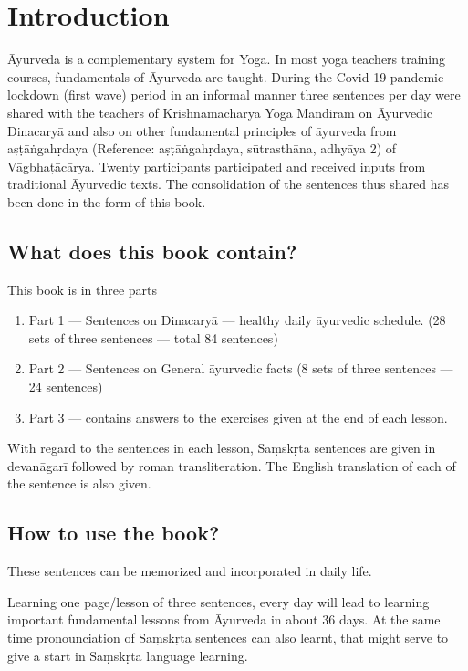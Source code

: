 \chapter*{Introduction}

Āyurveda is a complementary system for Yoga. In most yoga teachers training courses, fundamentals of Āyurveda are taught. During the Covid 19 pandemic lockdown (first wave) period in an informal manner three sentences per day were shared with the teachers of Krishnamacharya Yoga Mandiram on Āyurvedic Dinacaryā and also on other fundamental principles of āyurveda from aṣṭāṅgahṛdaya (Reference: aṣṭāṅgahṛdaya,  sūtrasthāna, adhyāya 2) of Vāgbhaṭācārya. Twenty participants participated and received inputs from traditional Āyurvedic texts. The consolidation of the sentences thus shared has been done in the form of this book.

\section*{What does this book contain?}
\vspace{-5pt}

This book is in three parts 
\vspace{-5pt}
\begin{enumerate}
\itemsep=0pt
\renewcommand{\theenumi}{\alph{enumi}}
\renewcommand{\labelenumi}{\theenumi.}
\item Part 1 --- Sentences on Dinacaryā --- healthy daily āyurvedic schedule. (28 sets of three sentences --- total 84 sentences)
\item Part 2 --- Sentences on General āyurvedic facts (8 sets of three sentences --- 24 sentences) 
\item Part 3 --- contains answers to the exercises given at the end of each lesson.
\end{enumerate}

With regard to the sentences in each lesson, Saṃskṛta sentences are given in devanāgarī   followed by roman transliteration. The English translation of each of the sentence is also given.

\section*{How to use the book?}

These sentences can be memorized and incorporated in daily life. 

Learning one page/lesson of three sentences, every day will lead to learning important fundamental lessons from Āyurveda in about 36 days. At the same time pronounciation of Saṃskṛta sentences can also learnt, that might serve to give a start in Saṃskṛta language learning.

